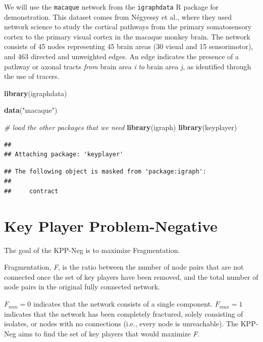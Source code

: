 \documentclass[
]{book}
\newenvironment{Shaded}{\begin{snugshade}}{\end{snugshade}}
\newcommand{\CommentTok}[1]{\textcolor[rgb]{0.56,0.35,0.01}{\textit{#1}}}
\newcommand{\FunctionTok}[1]{\textcolor[rgb]{0.13,0.29,0.53}{\textbf{#1}}}
\newcommand{\NormalTok}[1]{#1}
\newcommand{\StringTok}[1]{\textcolor[rgb]{0.31,0.60,0.02}{#1}}
\begin{document}
We will use the \texttt{macaque} network from the \texttt{igraphdata} R package for demonstration. This dataset comes from Négyessy et al., where they used network science to study the cortical pathways from the primary somatosensory cortex to the primary visual cortex in the macaque monkey brain. The network consists of 45 nodes representing 45 brain areas (30 visual and 15 sensorimotor), and 463 directed and unweighted edges. An edge indicates the presence of a pathway or axonal tracts \emph{from} brain area \emph{i} \emph{to} brain area \emph{j}, as identified through the use of tracers.

\begin{Shaded}
\begin{Highlighting}[]
\FunctionTok{library}\NormalTok{(igraphdata)}

\FunctionTok{data}\NormalTok{(}\StringTok{"macaque"}\NormalTok{)}

\CommentTok{\# load the other packages that we need }
\FunctionTok{library}\NormalTok{(igraph)}
\FunctionTok{library}\NormalTok{(keyplayer)}
\end{Highlighting}
\end{Shaded}

\begin{verbatim}
## 
## Attaching package: 'keyplayer'
\end{verbatim}

\begin{verbatim}
## The following object is masked from 'package:igraph':
## 
##     contract
\end{verbatim}

\section{Key Player Problem-Negative}\label{key-player-problem-negative}

The goal of the KPP-Neg is to maximize Fragmentation.

Fragmentation, \emph{F}, is the ratio between the number of node pairs that are not connected once the set of key players have been removed, and the total number of node pairs in the original fully connected network.

\(F_{min} = 0\) indicates that the network consists of a single component. \(F_{max} = 1\) indicates that the network has been completely fractured, solely consisting of isolates, or nodes with no connections (i.e., every node is unreachable). The KPP-Neg aims to find the set of key players that would maximize \emph{F}.
\end{document}
